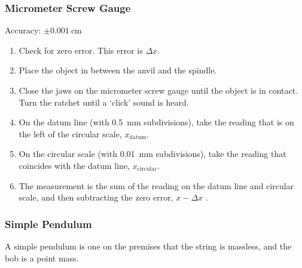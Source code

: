 \documentclass[../main.tex]{subfiles}
\begin{document}
		\subsubsection*{Micrometer Screw Gauge}
		Accuracy: \(\pm \SI{0.001}{\centi\meter}\)
		\begin{enumerate}
			\item Check for zero error. This error is \(\Delta x\).
			\item Place the object in between the anvil and the spindle.
			\item Close the jaws on the micrometer screw gauge until the object is in contact. Turn  the ratchet until a `click' sound is heard.
			\item On the datum line (with \SI{0.5}{\milli\meter} subdivisions), take the reading that is on the left of the circular scale, \(x_\mathrm{datum}\).
			\item On the circular scale (with \SI{0.01}{\milli\meter} subdivisions), take the reading that coincides with the datum line, \(x_\mathrm{circular}\).
			\item The measurement is the sum of the reading on the datum line and circular scale, and then subtracting the zero error, \(x-\Delta x\) .
		\end{enumerate}
	
		\subsubsection{Simple Pendulum}
		A simple pendulum is one on the premises that the string is massless, and the bob is a point mass.
		
		\begin{center}
		\end{center}
		
\end{document}
